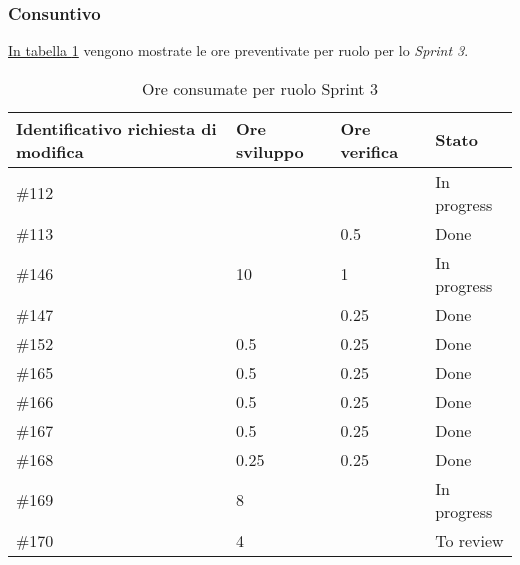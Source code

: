 \subsubsection{Consuntivo}

\hyperref[tab:sprint3_ore_consumate]{In tabella \ref{tab:sprint3_ore_consumate}} vengono mostrate le ore preventivate per ruolo per lo \textit{Sprint 3}.

\begin{table}[H]
    \centering
        \begin{tabular}{| l | l | l | l |}
            \hline
                \textbf{Identificativo richiesta di modifica} & 
                \textbf{Ore sviluppo} &
                \textbf{Ore verifica} & 
                \textbf{Stato}\\ 
    \hline
        \#112 &  & & In progress\\
    \hline
        \#113 &  & 0.5 & Done\\
    \hline
        \#146 & 10 & 1 & In progress\\
    \hline
        \#147 &  & 0.25 & Done \\
    \hline
        \#152 & 0.5 & 0.25 & Done\\
    \hline
        \#165 & 0.5 & 0.25 & Done\\
    \hline
        \#166 & 0.5 & 0.25 & Done\\
    \hline
        \#167 & 0.5 & 0.25 & Done\\
    \hline
        \#168 & 0.25 & 0.25 & Done\\
    \hline
        \#169 & 8 & & In progress\\
    \hline
        \#170 & 4 & & To review\\
    \hline
    \end{tabular}
    \caption{Ore consumate per ruolo Sprint 3}
    \label{tab:sprint3_ore_consumate} 
\end{table}